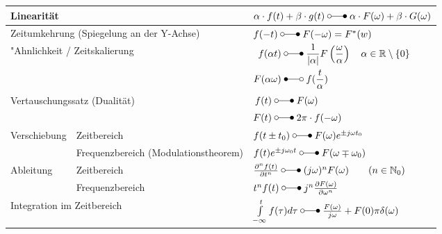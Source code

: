 	     
	\begin{tabular}{|p{3cm}|p{6.5cm}p{9cm}|}
		\hline
			\multicolumn{2}{|l}{Linearität}                                & $\alpha\cdot f(t) + \beta\cdot g(t) \; \laplace \; \alpha\cdot F(\omega) +\beta\cdot G(\omega)$                                                                                             \\ 
		\hline
			\multicolumn{2}{|l}{Zeitumkehrung (Spiegelung an der Y-Achse)} & $f(-t) \; \laplace \; F(-\omega) = F^*(w)$                                                                                                                                                  \\ 
		\hline
			\multicolumn{2}{|l}{"Ahnlichkeit / Zeitskalierung}             &      		$\begin{aligned}f(\alpha t) \; &\laplace \; \frac{1}{|\alpha|}F \left (\frac{\omega}{\alpha} \right)
				     		\quad\alpha \in\mathbb{R}\setminus \{0\}\\
				     		F(\alpha\omega) \; &\Laplace \; f(\frac{t}{\alpha})\end{aligned}$\\ 
		\hline
			\multicolumn{2}{|l}{Vertauschungssatz (Dualität)}              & 
			\begin{math}
				\begin{aligned}
					f(t) \; &\laplace \; F(\omega)\nonumber \\ 
					F(t) \; &\laplace \; 2\pi \cdot f(-\omega)
				\end{aligned}
			\end{math}\\ 
		\hline
		\hline
			\multirow{2}{*}{Verschiebung} & Zeitbereich & $f(t\pm t_0) \; \laplace \; F(\omega)e^{\pm j\omega t_0}$ \\ 
			\cline{2-3} 
			& Frequenzbereich (Modulationstheorem) & $f(t)e^{\pm j\omega_0 t} \; \laplace \; F(\omega\mp\omega_0)$ \\ 
   		\hline
   		\hline
	   		\multirow{2}{*}{Ableitung} & Zeitbereich & $\frac{\partial^n f(t)}{\partial t^n} \; \laplace \; (j\omega)^n F(\omega) \qquad (n \in \mathbb{N}_0)$ \\ 
	   		\cline{2-3} 
	   		& Frequenzbereich &  $t^n f(t) \; \laplace \; j^n \frac{\partial F(\omega)}{\partial \omega^n}$\\ 
   		\hline
   		\hline
   			\multicolumn{2}{|l}{Integration im Zeitbereich} & $\int\limits_{-\infty}^{t}f(\tau)d\tau \; \laplace \;
   			\frac{F(\omega)}{j\omega}+F(0)\pi\delta(\omega)$\\ 

\end{tabular}

